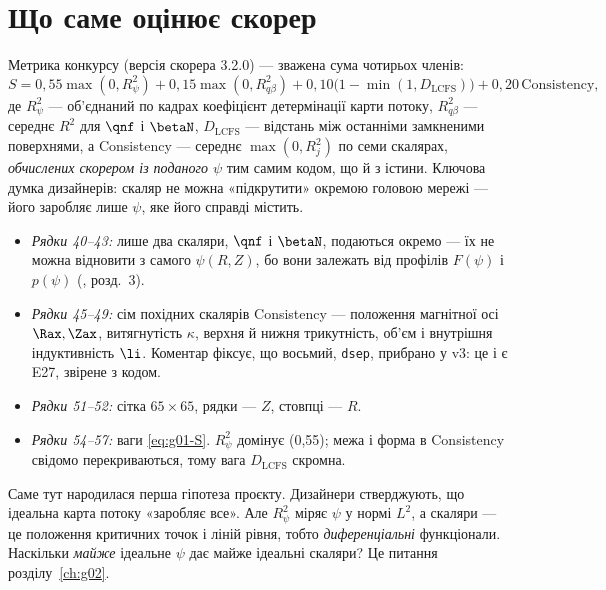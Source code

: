 \section{Що саме оцінює скорер}\label{sec:g01-scorer}

Метрика конкурсу (версія скорера 3.2.0) --- зважена сума чотирьох членів:
\begin{equation}\label{eq:g01-S}
S = 0{,}55\max(0,R^2_\psi) + 0{,}15\max(0,R^2_{q\beta})
  + 0{,}10\bigl(1-\min(1,D_{\mathrm{LCFS}})\bigr) + 0{,}20\,\mathrm{Consistency},
\end{equation}
де $R^2_\psi$ --- об'єднаний по кадрах коефіцієнт детермінації карти потоку,
$R^2_{q\beta}$ --- середнє $R^2$ для $\qnf$ і $\betaN$, $D_{\mathrm{LCFS}}$ --- відстань
між останніми замкненими поверхнями, а Consistency --- середнє $\max(0,R^2_j)$ по семи
скалярах, \emph{обчислених скорером із поданого $\psi$} тим самим кодом, що й з істини.
Ключова думка дизайнерів: скаляр не можна «підкрутити» окремою головою мережі --- його
заробляє лише $\psi$, яке його справді містить.


\begin{itemize}
\item \emph{Рядки 40--43:} лише два скаляри, $\qnf$ і $\betaN$, подаються окремо --- їх не
  можна відновити з самого $\psi(R,Z)$, бо вони залежать від профілів $F(\psi)$ і
  $p(\psi)$ (\cite{Manual}, розд.~3).
\item \emph{Рядки 45--49:} сім похідних скалярів Consistency --- положення магнітної осі
  $\Rax,\Zax$, витягнутість $\kappa$, верхня й нижня трикутність, об'єм і внутрішня
  індуктивність $\li$. Коментар фіксує, що восьмий, \texttt{dsep}, прибрано у v3: це і є
  E27, звірене з кодом.
\item \emph{Рядки 51--52:} сітка $65\times65$, рядки --- $Z$, стовпці --- $R$.
\item \emph{Рядки 54--57:} ваги \eqref{eq:g01-S}. $R^2_\psi$ домінує (0,55); межа і
  форма в Consistency свідомо перекриваються, тому вага $D_{\mathrm{LCFS}}$ скромна.
\end{itemize}

Саме тут народилася перша гіпотеза проєкту. Дизайнери стверджують, що ідеальна карта
потоку «заробляє все». Але $R^2_\psi$ міряє $\psi$ у нормі $L^2$, а скаляри --- це
положення критичних точок і ліній рівня, тобто \emph{диференціальні} функціонали.
Наскільки \emph{майже} ідеальне $\psi$ дає майже ідеальні скаляри? Це питання
розділу~\ref{ch:g02}.

